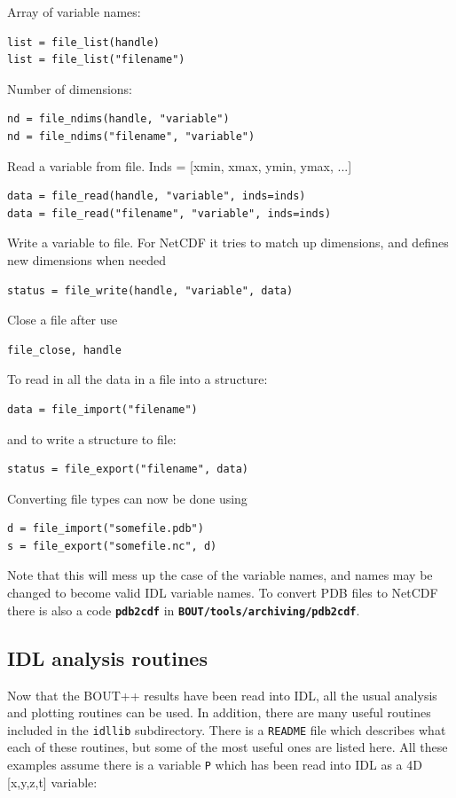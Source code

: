 \documentclass[12pt]{article}
\newcommand{\code}[1]{\texttt{#1}}
\newcommand{\file}[1]{\texttt{\bf #1}}
\begin{document}
Array of variable names:
\begin{verbatim}
list = file_list(handle)
list = file_list("filename")
\end{verbatim}

Number of dimensions:
\begin{verbatim}
nd = file_ndims(handle, "variable")
nd = file_ndims("filename", "variable")
\end{verbatim}

Read a variable from file. Inds = [xmin, xmax, ymin, ymax, ...]
\begin{verbatim}
data = file_read(handle, "variable", inds=inds)
data = file_read("filename", "variable", inds=inds)
\end{verbatim}

Write a variable to file. For NetCDF it tries to match up
dimensions, and defines new dimensions when needed
\begin{verbatim}
status = file_write(handle, "variable", data)
\end{verbatim}

Close a file after use
\begin{verbatim}
file_close, handle
\end{verbatim}

To read in all the data in a file into a structure:
\begin{verbatim}
data = file_import("filename")
\end{verbatim}

and to write a structure to file:
\begin{verbatim}
status = file_export("filename", data)
\end{verbatim}

Converting file types can now be done using
\begin{verbatim}
d = file_import("somefile.pdb")
s = file_export("somefile.nc", d)
\end{verbatim}

Note that this will mess up the case of the variable names,
and names may be changed to become valid IDL variable names.
To convert PDB files to NetCDF there is also a code \file{pdb2cdf} in \file{BOUT/tools/archiving/pdb2cdf}.

\subsection{IDL analysis routines}

Now that the BOUT++ results have been read into IDL, all the usual analysis 
and plotting routines can be used. In addition, there are many useful routines
included in the \texttt{idllib} subdirectory. There is a \texttt{README}
file which describes what each of these routines, but some of the most useful
ones are listed here. All these examples assume there is a variable \code{P}
which has been read into IDL as a 4D [x,y,z,t] variable:
\end{document}
